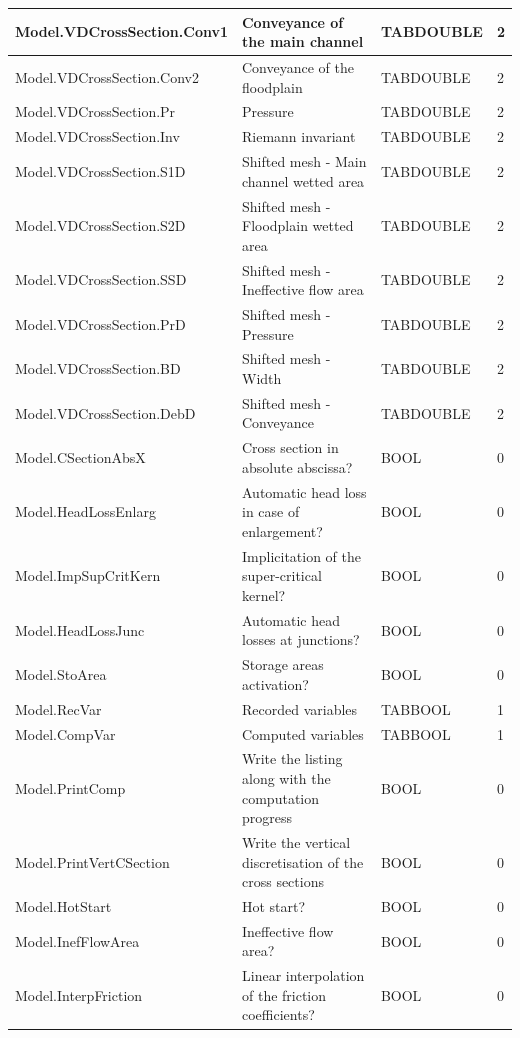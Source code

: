 \documentclass[a4paper,11pt]{article}
\begin{document}
\begin{landscape}
\begin{table}[ht]
\begin{center}
\begin{tabular}{|l|l|l|l|}
\hline  Model.VDCrossSection.Conv1 & Conveyance of the main channel & TABDOUBLE & 2 \\
\hline  Model.VDCrossSection.Conv2 & Conveyance of the floodplain & TABDOUBLE & 2 \\
\hline  Model.VDCrossSection.Pr & Pressure & TABDOUBLE & 2 \\
\hline  Model.VDCrossSection.Inv & Riemann invariant & TABDOUBLE & 2 \\
\hline  Model.VDCrossSection.S1D & Shifted mesh - Main channel wetted area & TABDOUBLE & 2 \\
\hline  Model.VDCrossSection.S2D & Shifted mesh - Floodplain wetted area & TABDOUBLE & 2 \\
\hline  Model.VDCrossSection.SSD & Shifted mesh - Ineffective flow area & TABDOUBLE & 2 \\
\hline  Model.VDCrossSection.PrD & Shifted mesh - Pressure & TABDOUBLE & 2 \\
\hline  Model.VDCrossSection.BD & Shifted mesh - Width & TABDOUBLE & 2 \\
\hline  Model.VDCrossSection.DebD & Shifted mesh - Conveyance & TABDOUBLE & 2 \\
\hline  Model.CSectionAbsX & Cross section in absolute abscissa? & BOOL & 0 \\
\hline  Model.HeadLossEnlarg & Automatic head loss in case of enlargement? & BOOL & 0 \\
\hline  Model.ImpSupCritKern & Implicitation of the super-critical kernel? & BOOL & 0 \\
\hline  Model.HeadLossJunc & Automatic head losses at junctions? & BOOL & 0 \\
\hline  Model.StoArea & Storage areas activation? & BOOL & 0 \\
\hline  Model.RecVar & Recorded variables & TABBOOL & 1 \\
\hline  Model.CompVar & Computed variables & TABBOOL & 1 \\
\hline  Model.PrintComp & Write the listing along with the computation progress & BOOL & 0 \\
\hline  Model.PrintVertCSection & Write the vertical discretisation of the cross sections & BOOL & 0 \\
\hline  Model.HotStart & Hot start? & BOOL & 0 \\
\hline  Model.InefFlowArea & Ineffective flow area? & BOOL & 0 \\
\hline  Model.InterpFriction & Linear interpolation of the friction coefficients? & BOOL & 0 \\

\end{tabular}
\end{center}
\end{table}
\end{landscape}
\end{document}
